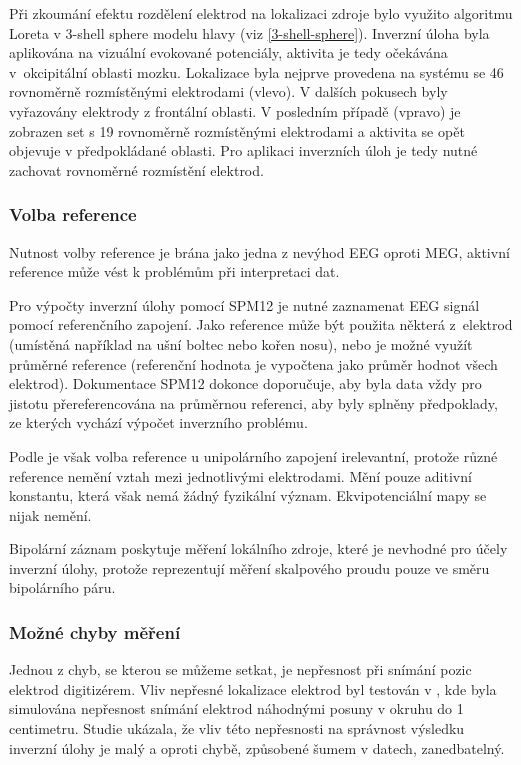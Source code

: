 Při zkoumání efektu rozdělení elektrod na lokalizaci zdroje bylo využito algoritmu Loreta v 3-shell sphere modelu hlavy (viz \ref{3-shell-sphere}). Inverzní úloha byla aplikována na vizuální evokované potenciály, aktivita je tedy očekávána v~okcipitální oblasti mozku. Lokalizace byla nejprve provedena na systému se 46 rovnoměrně rozmístěnými elektrodami (vlevo). V dalších pokusech byly vyřazovány elektrody z frontální oblasti. V posledním případě (vpravo) je zobrazen set s 19 rovnoměrně rozmístěnými elektrodami a aktivita se opět objevuje v předpokládané oblasti. Pro aplikaci inverzních úloh je tedy nutné zachovat rovnoměrné rozmístění elektrod. 


\subsubsection{Volba reference}
Nutnost volby reference je brána jako jedna z nevýhod EEG oproti MEG, aktivní reference může vést k problémům při interpretaci dat. \cite{36,37}

Pro výpočty inverzní úlohy pomocí SPM12 je nutné zaznamenat EEG signál pomocí referenčního zapojení. Jako reference může být použita některá z~elektrod (umístěná například na ušní boltec nebo kořen nosu), nebo je možné využít průměrné reference (referenční hodnota je vypočtena jako průměr hodnot všech elektrod). Dokumentace SPM12 dokonce doporučuje, aby byla data vždy pro jistotu přereferencována na průměrnou referenci, aby byly splněny předpoklady, ze kterých vychází výpočet inverzního problému. \cite{35} 

Podle \cite{38} je však volba reference u unipolárního zapojení irelevantní, protože různé reference nemění vztah mezi jednotlivými elektrodami. Mění pouze aditivní konstantu, která však nemá žádný fyzikální význam. Ekvipotenciální mapy se nijak nemění.

Bipolární záznam poskytuje měření lokálního zdroje, které je nevhodné pro účely inverzní úlohy, protože reprezentují měření skalpového proudu pouze ve směru bipolárního páru. \cite{31}


\subsubsection{Možné chyby měření}
Jednou z chyb, se kterou se můžeme setkat, je nepřesnost při snímání pozic elektrod digitizérem. Vliv nepřesné lokalizace elektrod byl testován v \cite{39}, kde byla simulována nepřesnost snímání elektrod náhodnými posuny v okruhu do 1 centimetru. Studie ukázala, že vliv této nepřesnosti na správnost výsledku inverzní úlohy je malý a oproti chybě, způsobené šumem v datech, zanedbatelný.

